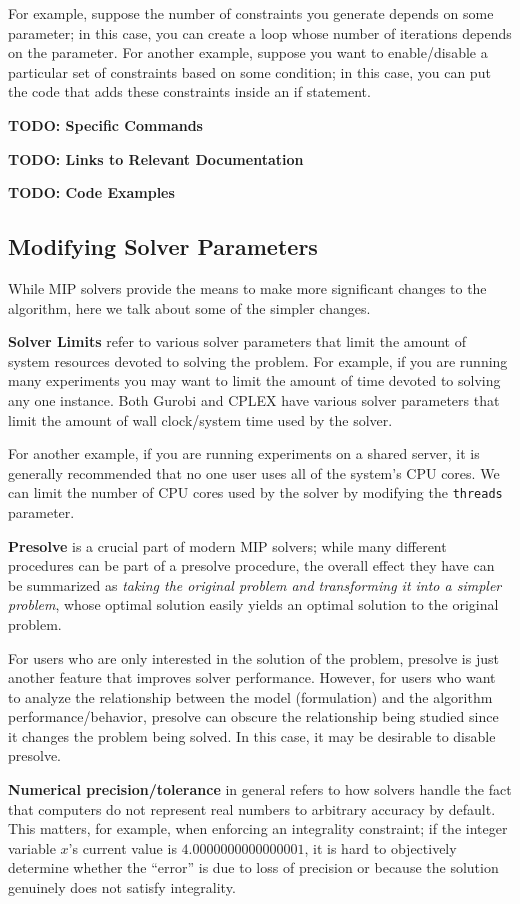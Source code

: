 \documentclass[12pt]{article}
\newcommand\red[1]{{\color{red}#1}}
\begin{document}
For example, suppose the number of constraints you generate depends on some parameter; in this case, you can create a loop whose number of iterations depends on the parameter. For another example, suppose you want to enable/disable a particular set of constraints based on some condition; in this case, you can put the code that adds these constraints inside an if statement.

\red{\textbf{TODO: Specific Commands}}

\red{\textbf{TODO: Links to Relevant Documentation}}

\red{\textbf{TODO: Code Examples}}

\subsection{Modifying Solver Parameters}
While MIP solvers provide the means to make more significant changes to the algorithm, here we talk about some of the simpler changes.

\textbf{Solver Limits} refer to various solver parameters that limit the amount of system resources devoted to solving the problem. For example, if you are running many experiments you may want to limit the amount of time devoted to solving any one instance. Both Gurobi and CPLEX have various solver parameters that limit the amount of wall clock/system time used by the solver.

For another example, if you are running experiments on a shared server, it is generally recommended that no one user uses all of the system's CPU cores. We can limit the number of CPU cores used by the solver by modifying the \texttt{threads} parameter.

\textbf{Presolve} is a crucial part of modern MIP solvers; while many different procedures can be part of a presolve procedure, the overall effect they have can be summarized as \emph{taking the original problem and transforming it into a simpler problem}, whose optimal solution easily yields an optimal solution to the original problem.

For users who are only interested in the solution of the problem, presolve is just another feature that improves solver performance. However, for users who want to analyze the relationship between the model (formulation) and the algorithm performance/behavior, presolve can obscure the relationship being studied since it changes the problem being solved. In this case, it may be desirable to disable presolve.

\textbf{Numerical precision/tolerance} in general refers to how solvers handle the fact that computers do not represent real numbers to arbitrary accuracy by default. This matters, for example, when enforcing an integrality constraint; if the integer variable $x$'s current value is $4.0000000000000001$, it is hard to objectively determine whether the ``error'' is due to loss of precision or because the solution genuinely does not satisfy integrality.
\end{document}
